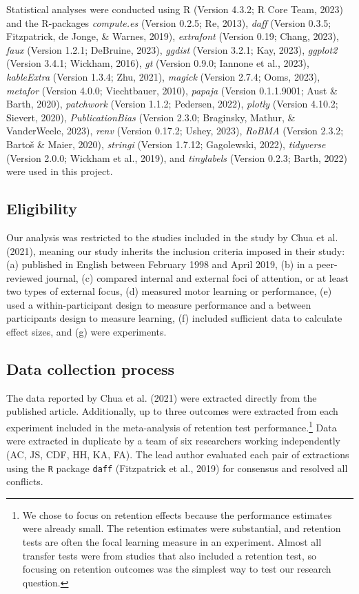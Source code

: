 \documentclass[
  man, donotrepeattitle,floatsintext]{apa7}
\begin{document}
Statistical analyses were conducted using R (Version 4.3.2; R Core Team, 2023) and the R-packages \emph{compute.es} (Version 0.2.5; Re, 2013), \emph{daff} (Version 0.3.5; Fitzpatrick, de Jonge, \& Warnes, 2019), \emph{extrafont} (Version 0.19; Chang, 2023), \emph{faux} (Version 1.2.1; DeBruine, 2023), \emph{ggdist} (Version 3.2.1; Kay, 2023), \emph{ggplot2} (Version 3.4.1; Wickham, 2016), \emph{gt} (Version 0.9.0; Iannone et al., 2023), \emph{kableExtra} (Version 1.3.4; Zhu, 2021), \emph{magick} (Version 2.7.4; Ooms, 2023), \emph{metafor} (Version 4.0.0; Viechtbauer, 2010), \emph{papaja} (Version 0.1.1.9001; Aust \& Barth, 2020), \emph{patchwork} (Version 1.1.2; Pedersen, 2022), \emph{plotly} (Version 4.10.2; Sievert, 2020), \emph{PublicationBias} (Version 2.3.0; Braginsky, Mathur, \& VanderWeele, 2023), \emph{renv} (Version 0.17.2; Ushey, 2023), \emph{RoBMA} (Version 2.3.2; Bartoš \& Maier, 2020), \emph{stringi} (Version 1.7.12; Gagolewski, 2022), \emph{tidyverse} (Version 2.0.0; Wickham et al., 2019), and \emph{tinylabels} (Version 0.2.3; Barth, 2022) were used in this project.

\hypertarget{eligibility}{%
\subsection{Eligibility}\label{eligibility}}

Our analysis was restricted to the studies included in the study by Chua et al. (2021), meaning our study inherits the inclusion criteria imposed in their study: (a) published in English between February 1998 and April 2019, (b) in a peer-reviewed journal, (c) compared internal and external foci of attention, or at least two types of external focus, (d) measured motor learning or performance, (e) used a within-participant design to measure performance and a between participants design to measure learning, (f) included sufficient data to calculate effect sizes, and (g) were experiments.

\hypertarget{data-collection-process}{%
\subsection{Data collection process}\label{data-collection-process}}

The data reported by Chua et al. (2021) were extracted directly from the published article. Additionally, up to three outcomes were extracted from each experiment included in the meta-analysis of retention test performance.\footnote{We chose to focus on retention effects because the performance estimates were already small. The retention estimates were substantial, and retention tests are often the focal learning measure in an experiment. Almost all transfer tests were from studies that also included a retention test, so focusing on retention outcomes was the simplest way to test our research question.} Data were extracted in duplicate by a team of six researchers working independently (AC, JS, CDF, HH, KA, FA). The lead author evaluated each pair of extractions using the \texttt{R} package \texttt{daff} (Fitzpatrick et al., 2019) for consensus and resolved all conflicts.
\end{document}
